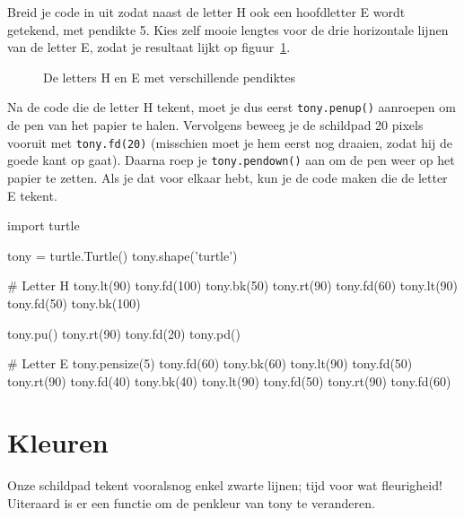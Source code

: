 \documentclass[../main]{subfiles}
\begin{document}
\begin{opgave}[icons={laptop}]
Breid je code in  uit zodat naast de letter \textsf{H} ook een hoofdletter \textsf{E} wordt getekend, met pendikte 5. Kies zelf mooie lengtes voor de drie horizontale lijnen van de letter \textsf{E}, zodat je resultaat lijkt op figuur~\ref{fig:hello_turtle_03}.

\begin{figure}[ht]
    \centering
    \caption{De letters H en E met verschillende pendiktes}%
    \label{fig:hello_turtle_03}
\end{figure}

\begin{hints}
\item Na de code die de letter \textsf{H} tekent, moet je dus eerst \texttt{tony.penup()} aanroepen om de pen van het papier te halen. Vervolgens beweeg je de schildpad 20 pixels vooruit met \texttt{tony.fd(20)} (misschien moet je hem eerst nog draaien, zodat hij de goede kant op gaat). Daarna roep je \texttt{tony.pendown()} aan om de pen weer op het papier te zetten. Als je dat voor elkaar hebt, kun je de code maken die de letter \textsf{E} tekent.
\end{hints}
\end{opgave}
\begin{antwoord}
\begin{python-breakable}[style=mu-noframe]
import turtle

tony = turtle.Turtle()
tony.shape('turtle')

# Letter H
tony.lt(90)
tony.fd(100)
tony.bk(50)
tony.rt(90)
tony.fd(60)
tony.lt(90)
tony.fd(50)
tony.bk(100)

tony.pu()
tony.rt(90)
tony.fd(20)
tony.pd()

# Letter E
tony.pensize(5)
tony.fd(60)
tony.bk(60)
tony.lt(90)
tony.fd(50)
tony.rt(90)
tony.fd(40)
tony.bk(40)
tony.lt(90)
tony.fd(50)
tony.rt(90)
tony.fd(60)
\end{python-breakable}
\end{antwoord}
\section{Kleuren}%
\label{sec:kleuren}

Onze schildpad tekent vooralsnog enkel zwarte lijnen; tijd voor wat fleurigheid! Uiteraard is er een functie om de penkleur van tony te veranderen.
\end{document}
